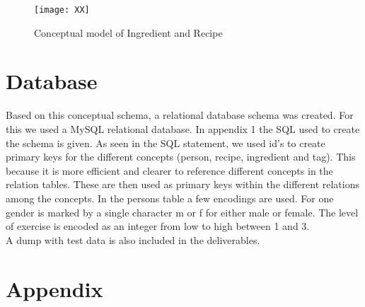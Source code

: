 \documentclass{article}
\begin{document}
\begin{figure}[H]
\centering
\texttt{[image: XX]}
\caption{Conceptual model of Ingredient and Recipe}
\end{figure}


\section{Database}
Based on this conceptual schema, a relational database schema was created. For this we used a MySQL relational database. In appendix 1 the SQL used to create the schema is given. As seen in the SQL statement, we used id's to create primary keys for the different concepts (person, recipe, ingredient and tag). This because it is more efficient and clearer to reference different concepts in the relation tables. These are then used as primary keys within the different relations among the concepts. In the persons table a few encodings are used. For one gender is marked by a single character m or f for either male or female. The level of exercise is encoded as an integer from low to high between 1 and 3.\\
A dump with test data is also included in the deliverables. 


\section*{Appendix}
\end{document}
